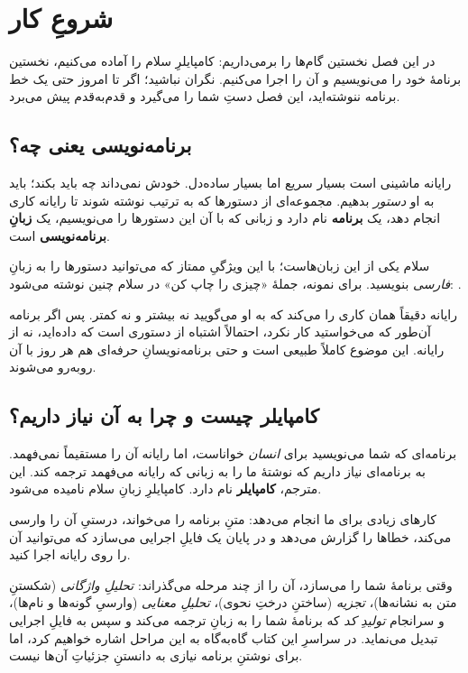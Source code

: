 \chapter{شروعِ کار}%
\label{ch:getting-started}

در این فصل نخستین گام‌ها را برمی‌داریم: کامپایلرِ سلام را آماده می‌کنیم،
نخستین برنامهٔ خود را می‌نویسیم و آن را اجرا می‌کنیم. نگران نباشید؛ اگر تا
امروز حتی یک خط برنامه ننوشته‌اید، این فصل دستِ شما را می‌گیرد و قدم‌به‌قدم
پیش می‌برد.

\section{برنامه‌نویسی یعنی چه؟}

رایانه ماشینی است بسیار سریع اما بسیار ساده‌دل. خودش نمی‌داند چه باید بکند؛
باید به او \emph{دستور} بدهیم. مجموعه‌ای از دستورها که به ترتیب نوشته شوند تا
رایانه کاری انجام دهد، یک \textbf{برنامه} نام دارد و زبانی که با آن این دستورها
را می‌نویسیم، یک \textbf{زبانِ برنامه‌نویسی} است.

سلام یکی از این زبان‌هاست؛ با این ویژگیِ ممتاز که می‌توانید دستورها را به زبانِ
\emph{فارسی} بنویسید. برای نمونه، جملهٔ «چیزی را چاپ کن» در سلام چنین نوشته
می‌شود:
.

\begin{note}
رایانه دقیقاً همان کاری را می‌کند که به او می‌گویید نه بیشتر و نه کمتر. پس
اگر برنامه آن‌طور که می‌خواستید کار نکرد، احتمالاً اشتباه از دستوری است که داده‌اید،
نه از رایانه. این موضوع کاملاً طبیعی است و حتی برنامه‌نویسانِ حرفه‌ای هم هر روز
با آن روبه‌رو می‌شوند.
\end{note}

\section{کامپایلر چیست و چرا به آن نیاز داریم؟}

برنامه‌ای که شما می‌نویسید برای \emph{انسان} خواناست، اما رایانه آن را
مستقیماً نمی‌فهمد. به برنامه‌ای نیاز داریم که نوشتهٔ ما را به زبانی که رایانه
می‌فهمد ترجمه کند. این مترجم، \textbf{کامپایلر} نام دارد. کامپایلرِ زبانِ سلام
 نامیده می‌شود.

 کارهای زیادی برای ما انجام می‌دهد: متنِ برنامه را می‌خواند،
درستیِ آن را وارسی می‌کند، خطاها را گزارش می‌دهد و در پایان یک فایلِ اجرایی
می‌سازد که می‌توانید آن را روی رایانه اجرا کنید.

\begin{deep}
وقتی  برنامهٔ شما را می‌سازد، آن را از چند مرحله می‌گذراند:
\emph{تحلیلِ واژگانی} (شکستنِ متن به نشانه‌ها)، \emph{تجزیه} (ساختنِ درختِ
نحوی)، \emph{تحلیلِ معنایی} (وارسیِ گونه‌ها و نام‌ها)، و سرانجام \emph{تولیدِ کد}
که برنامهٔ شما را به زبانِ  ترجمه می‌کند و سپس به فایلِ اجرایی تبدیل
می‌نماید. در سراسرِ این کتاب گاه‌به‌گاه به این مراحل اشاره خواهیم کرد، اما برای
نوشتنِ برنامه نیازی به دانستنِ جزئیاتِ آن‌ها نیست.
\end{deep}

